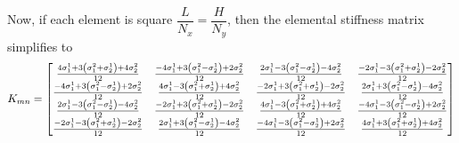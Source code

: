 Now, if each element is square \ie $\dfrac{L}{N_{x}}=\dfrac{H}{N_{y}}$, then the elemental stiffness matrix simplifies to
\begin{equation}
  K_{mn}=\begin{bmatrix}
  \frac{4\conductivitytensorsymbol^{1}_{1}+3\pbrac{\conductivitytensorsymbol^{2}_{1}+
      \conductivitytensorsymbol^{1}_{2}}+4\conductivitytensorsymbol^{2}_{2}}{12} &
  \frac{-4\conductivitytensorsymbol^{1}_{1}+3\pbrac{\conductivitytensorsymbol^{2}_{1}-
      \conductivitytensorsymbol^{1}_{2}}+2\conductivitytensorsymbol^{2}_{2}}{12} &
  \frac{2\conductivitytensorsymbol^{1}_{1}-3\pbrac{\conductivitytensorsymbol^{2}_{1}-
      \conductivitytensorsymbol^{1}_{2}}-4\conductivitytensorsymbol^{2}_{2}}{12} &
  \frac{-2\conductivitytensorsymbol^{1}_{1}-3\pbrac{\conductivitytensorsymbol^{2}_{1}+
        \conductivitytensorsymbol^{1}_{2}}-2\conductivitytensorsymbol^{2}_{2}}{12} \\
  \frac{-4\conductivitytensorsymbol^{1}_{1}+3\pbrac{\conductivitytensorsymbol^{2}_{1}-
      \conductivitytensorsymbol^{1}_{2}}+2\conductivitytensorsymbol^{2}_{2}}{12} &
  \frac{4\conductivitytensorsymbol^{1}_{1}-3\pbrac{\conductivitytensorsymbol^{2}_{1}+
      \conductivitytensorsymbol^{1}_{2}}+4\conductivitytensorsymbol^{2}_{2}}{12} &
  \frac{-2\conductivitytensorsymbol^{1}_{1}+3\pbrac{\conductivitytensorsymbol^{2}_{1}+
        \conductivitytensorsymbol^{1}_{2}}-2\conductivitytensorsymbol^{2}_{2}}{12} &
  \frac{2\conductivitytensorsymbol^{1}_{1}+3\pbrac{\conductivitytensorsymbol^{2}_{1}-
        \conductivitytensorsymbol^{1}_{2}}-4\conductivitytensorsymbol^{2}_{2}}{12} \\
  \frac{2\conductivitytensorsymbol^{1}_{1}-3\pbrac{\conductivitytensorsymbol^{2}_{1}-
      \conductivitytensorsymbol^{1}_{2}}-4\conductivitytensorsymbol^{2}_{2}}{12} &
  \frac{-2\conductivitytensorsymbol^{1}_{1}+3\pbrac{\conductivitytensorsymbol^{2}_{1}+
        \conductivitytensorsymbol^{1}_{2}}-2\conductivitytensorsymbol^{2}_{2}}{12} &
  \frac{4\conductivitytensorsymbol^{1}_{1}-3\pbrac{\conductivitytensorsymbol^{2}_{1}+
      \conductivitytensorsymbol^{1}_{2}}+4\conductivitytensorsymbol^{2}_{2}}{12} &
  \frac{-4\conductivitytensorsymbol^{1}_{1}-3\pbrac{\conductivitytensorsymbol^{2}_{1}-
      \conductivitytensorsymbol^{1}_{2}}+2\conductivitytensorsymbol^{2}_{2}}{12} \\
  \frac{-2\conductivitytensorsymbol^{1}_{1}-3\pbrac{\conductivitytensorsymbol^{2}_{1}+
        \conductivitytensorsymbol^{1}_{2}}-2\conductivitytensorsymbol^{2}_{2}}{12} &
  \frac{2\conductivitytensorsymbol^{1}_{1}+3\pbrac{\conductivitytensorsymbol^{2}_{1}-
        \conductivitytensorsymbol^{1}_{2}}-4\conductivitytensorsymbol^{2}_{2}}{12}&
  \frac{-4\conductivitytensorsymbol^{1}_{1}-3\pbrac{\conductivitytensorsymbol^{2}_{1}-
      \conductivitytensorsymbol^{1}_{2}}+2\conductivitytensorsymbol^{2}_{2}}{12} &
  \frac{4\conductivitytensorsymbol^{1}_{1}+3\pbrac{\conductivitytensorsymbol^{2}_{1}+
      \conductivitytensorsymbol^{1}_{2}}+4\conductivitytensorsymbol^{2}_{2}}{12}
  \end{bmatrix}
  \label{eqn:FEMTwoDGenLaplaceSquareElementStiffnessMatrix}
\end{equation}
